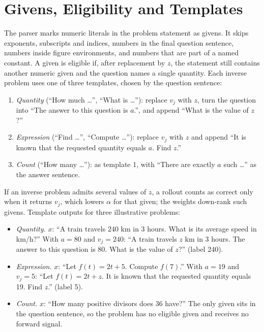 \documentclass[11pt]{article}
\theoremstyle{remark}
\begin{document}
\section{Givens, Eligibility and Templates}
\label{app:givens}

The parser marks numeric literals in the problem statement as givens. It skips exponents, subscripts and indices, numbers in the final question sentence, numbers inside figure environments, and numbers that are part of a named constant. A given is eligible if, after replacement by $z$, the statement still contains another numeric given and the question names a single quantity. Each inverse problem uses one of three templates, chosen by the question sentence:
\begin{enumerate}[leftmargin=*,itemsep=1pt,topsep=2pt]
  \item \emph{Quantity} (``How much \dots'', ``What is \dots''): replace $v_j$ with $z$, turn the question into ``The answer to this question is $a$.'', and append ``What is the value of $z$?''
  \item \emph{Expression} (``Find \dots'', ``Compute \dots''): replace $v_j$ with $z$ and append ``It is known that the requested quantity equals $a$. Find $z$.''
  \item \emph{Count} (``How many \dots''): as template 1, with ``There are exactly $a$ such \dots'' as the answer sentence.
\end{enumerate}
If an inverse problem admits several values of $z$, a rollout counts as correct only when it returns $v_j$, which lowers $\alpha$ for that given; the weights down-rank such givens. Template outputs for three illustrative problems:

\begin{small}
\begin{itemize}[leftmargin=*,itemsep=2pt,topsep=2pt]
  \item \emph{Quantity.} $x$: ``A train travels 240 km in 3 hours. What is its average speed in km/h?'' With $a=80$ and $v_j=240$: ``A train travels $z$ km in 3 hours. The answer to this question is 80. What is the value of $z$?'' (label 240).
  \item \emph{Expression.} $x$: ``Let $f(t)=2t+5$. Compute $f(7)$.'' With $a=19$ and $v_j=5$: ``Let $f(t)=2t+z$. It is known that the requested quantity equals 19. Find $z$.'' (label 5).
  \item \emph{Count.} $x$: ``How many positive divisors does 36 have?'' The only given sits in the question sentence, so the problem has no eligible given and receives no forward signal.
\end{itemize}
\end{small}
\end{document}

